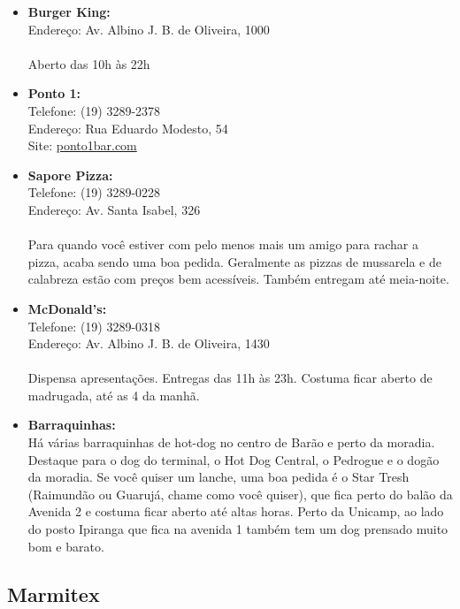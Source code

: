 \begin{itemize}
    \item   \textbf{Burger King:}
        \\Endereço: Av. Albino J. B. de Oliveira, 1000
        \\\\
        Aberto das 10h às 22h

    \item   \textbf{Ponto 1:}
        \\Telefone: (19) 3289-2378
        \\Endereço: Rua Eduardo Modesto, 54
        \\Site: \url{ponto1bar.com}

    \item   \textbf{Sapore Pizza:}
        \\Telefone: (19) 3289-0228
        \\Endereço: Av. Santa Isabel, 326
        \\\\
        Para quando você estiver com pelo menos mais um amigo para rachar a
        pizza, acaba sendo uma boa pedida. Geralmente as pizzas de mussarela e
        de calabreza estão com preços bem acessíveis. Também entregam até
        meia-noite.

    \item   \textbf{McDonald's:}
        \\Telefone: (19) 3289-0318
        \\Endereço: Av. Albino J. B. de Oliveira, 1430
        \\\\
        Dispensa apresentações. Entregas das 11h às 23h. Costuma ficar aberto de
        madrugada, até as 4 da manhã.

    \item   \textbf{Barraquinhas:}
        \\Há várias barraquinhas de hot-dog no centro de Barão e perto da
        moradia. Destaque para o dog do terminal, o Hot Dog Central, o Pedrogue
        e o dogão da moradia. Se você quiser um lanche, uma boa pedida é o Star
        Tresh (Raimundão ou Guarujá, chame como você quiser), que fica perto do
        balão da Avenida 2 e costuma ficar aberto até altas horas. Perto da
        Unicamp, ao lado do posto Ipiranga que fica na avenida 1 também tem um
        dog prensado muito bom e barato.
\end{itemize}

\subsection{Marmitex}


